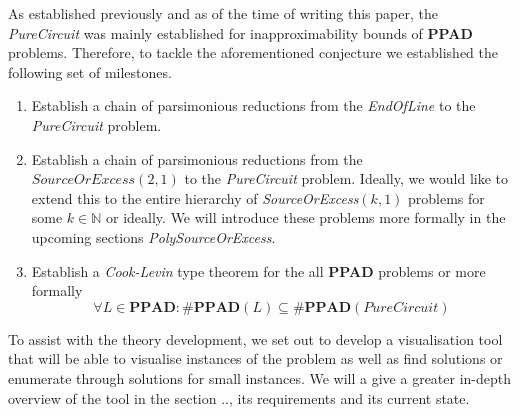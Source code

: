 As established previously and as of the time of writing this paper, the \textit{PureCircuit} was mainly established
for inapproximability bounds of \textbf{PPAD} problems. Therefore, to tackle the aforementioned conjecture
we established the following set of milestones.
\begin{enumerate}
    \item Establish a chain of parsimonious reductions from the \textit{EndOfLine} to the \textit{PureCircuit} problem.
    \item Establish a chain of parsimonious reductions from the $\textit{SourceOrExcess}(2,1)$ to the \textit{PureCircuit} problem.
          Ideally, we would like to extend this to the entire hierarchy of \textit{SourceOrExcess}$(k,1)$ problems for
          some $k \in \mathbb{N}$ or ideally. We will introduce these problems more formally in the upcoming sections
          \textit{PolySourceOrExcess}.
    \item Establish a \textit{Cook-Levin} type theorem for the all \textbf{PPAD} problems or more formally
          $$
              \forall L \in \textbf{PPAD}: \textbf{\#PPAD}(L) \subseteq  \textbf{\#PPAD}(\textit{PureCircuit})
          $$
\end{enumerate}

To assist with the theory development, we set out to develop a visualisation tool that will be able
to visualise instances of the problem as well as find solutions or enumerate through solutions for small instances.
We will a give a greater in-depth overview of the tool in the section {..}, its requirements and its current state.

